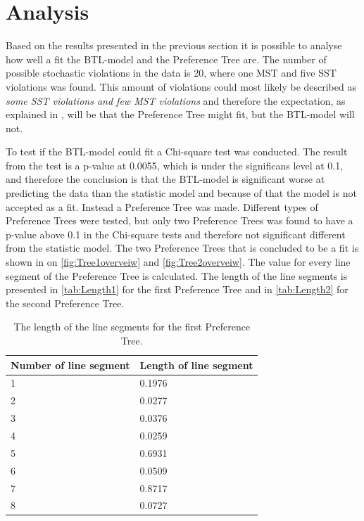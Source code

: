 \section*{Analysis}
\label{Analyse}
%
Based on the results presented in the previous section it is possible to analyse how well a fit the BTL-model and the Preference Tree are.\blankline
%
The number of possible stochastic violations in the data is 20, where one MST and five SST violations was found. This amount of violations could most likely be described as \textit{some SST violations and few MST violations} and therefore the expectation, as explained in , will be that the Preference Tree might fit, but the BTL-model will not. 

To test if the BTL-model could fit a Chi-square test was conducted. The result from the test is a p-value at 0.0055, which is under the significans level at 0.1, and therefore the conclusion is that the BTL-model is significant worse at predicting the data than the statistic model and because of that the model is not accepted as a fit. Instead a Preference Tree was made.\blankline
%
Different types of Preference Trees were tested, but only two Preference Trees was found to have a p-value above 0.1 in the Chi-square tests and therefore not significant different from the statistic model. The two Preference Trees that is concluded to be a fit is shown in  on \autoref{fig:Tree1overveiw} and \autoref{fig:Tree2overveiw}. The value for every line segment of the Preference Tree is calculated. The length of the line segments is presented in \autoref{tab:Length1} for the first Preference Tree and in \autoref{tab:Length2} for the second Preference Tree.  
%
\begin{table}[H]
	\centering
	\begin{tabular}{@{}ll@{}}
		\toprule
		Number of line segment  & Length of line segment \\ \midrule
		1					    & 0.1976   \\
		2      				    & 0.0277   \\
		3      				    & 0.0376   \\
		4      					& 0.0259   \\
		5      					& 0.6931   \\
		6      					& 0.0509   \\
		7      					& 0.8717   \\
		8						& 0.0727   \\ \bottomrule
	\end{tabular}
	\caption{The length of the line segments for the first Preference Tree.}
	\label{tab:Length1}
\end{table} 

